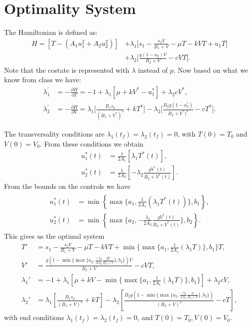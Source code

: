 \section*{Optimality System}
The Hamiltonian is defined as:
\begin{align*}
	H = [T-(A_1u_1^2+A_2u_2^2)]&+\lambda_1\Big[ s_1 - \frac{s_2V}{B_1+V}-\mu T-kVT+u_1T \Big] \\
	&+ \lambda_2 \Big[\frac{g(1-u_2)V}{B_2+V}-cVT\Big].
\end{align*}
Note that the costate is represented with $\lambda$ instead of $p$. Now based on what we know from class we have:
\begin{align*}
\lambda_1^{'} &=-\frac{\partial H}{\partial T} =  -1+\lambda_1[\mu+kV^*-u_1^*]+\lambda_2cV^*,\\
\lambda_2^{'} &= -\frac{\partial H}{\partial V} = \lambda_1\Big[\frac{B_1s_2}{(B_1+V^*)^2}+kT^*\Big] -\lambda_2\Big[\frac{B_2g(1-u_2^*)}{B_2+V^*)^2}-cT^*\Big].
\end{align*}

The transversality conditions are $\lambda_1(t_f)=\lambda_2(t_f)=0$, with $T(0)=T_0$ and $V(0)=V_0$. 
From these conditions we obtain
\begin{align*}
u_1^*(t) &= \frac{1}{2A_1}\left[\lambda_1T^*(t)\right],\\
u_2^*(t) &= \frac{1}{2A_2}\left[-\lambda_2\frac{gV^*(t)}{B_2+V^*(t)}\right].
\end{align*}
From the bounds on the controls we have
\begin{align*}
	\begin{split}
		u_1^*(t)&=\min\left\{\max\{a_1,\frac{1}{2A_1}(\lambda_1T^*(t))\},b_1\right\},\\
		u_2^*(t)&=\min\left\{\max\{a_2,-\frac{\lambda_2}{2A_2}\frac{gV^*(t)}{B_2+V^*(t)}\},b_2\right\}.
	\end{split}
\end{align*}
This gives us the optimal system
\begin{align*}
T'&=s_1-\frac{s_2V}{B_1+V}-\mu T-kVT+\min\{\max\{a_1,\frac{1}{2A_1}(\lambda_1T)\},b_1\}T,\\
V'&=\frac{g(1-\min\{\max\{a_2,\frac{-\lambda_2}{2A_2}\frac{gV}{B_2+V}\},b_2\})V}{B_2+V}-cVT,\\
\lambda_1'&=-1+\lambda_1\left[\mu+kV-\min\{\max\{a_1,\frac{1}{2A_1}(\lambda_1T)\},b_1\}\right]+\lambda_2cV,\\
\lambda_2'&=\lambda_1\left[\frac{B_1s_2}{(B_1+V)^2}+kT\right]-\lambda_2\left[\frac{B_2g(1-\min\{\max\{a_2,\frac{-\lambda_2}{2A_2}\frac{V}{B_2+V}\},b_2\})}{(B_2+V)^2}-cT\right],
\end{align*}
with end conditions $\lambda_1(t_f)=\lambda_2(t_f)=0$, and $T(0)=T_0,V(0)=V_0$.

